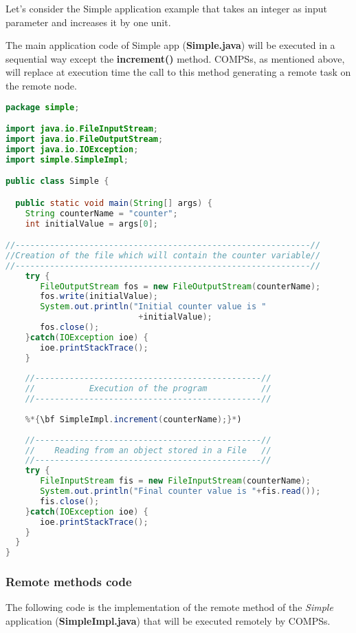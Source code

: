 Let’s consider the Simple application example that takes an integer as input parameter and increases it by one unit.

The main application code of Simple app ({\bf Simple.java}) will be executed in a sequential way except the
{\bf increment()} method. COMPSs, as mentioned above, will replace at execution time the call to this method
generating a remote task on the remote node.

\begin{lstlisting}[language=java]
package simple;

import java.io.FileInputStream;
import java.io.FileOutputStream;
import java.io.IOException;
import simple.SimpleImpl;

public class Simple {

  public static void main(String[] args) {
    String counterName = "counter";
    int initialValue = args[0];

//------------------------------------------------------------//
//Creation of the file which will contain the counter variable//
//------------------------------------------------------------//
    try {
       FileOutputStream fos = new FileOutputStream(counterName);
       fos.write(initialValue);
       System.out.println("Initial counter value is "
                           +initialValue);
       fos.close();
    }catch(IOException ioe) {
       ioe.printStackTrace();
    }
    
    //----------------------------------------------//
    //           Execution of the program           //
    //----------------------------------------------//
    
    %*{\bf SimpleImpl.increment(counterName);}*)
    
    //----------------------------------------------//
    //    Reading from an object stored in a File   //
    //----------------------------------------------//
    try {
       FileInputStream fis = new FileInputStream(counterName);
       System.out.println("Final counter value is "+fis.read());
       fis.close();
    }catch(IOException ioe) {
       ioe.printStackTrace();
    }
  }
}
\end{lstlisting}


\subsubsection{Remote methods code}

The following code is the implementation of the remote method of the {\it Simple} application ({\bf SimpleImpl.java})
that will be executed remotely by COMPSs.

